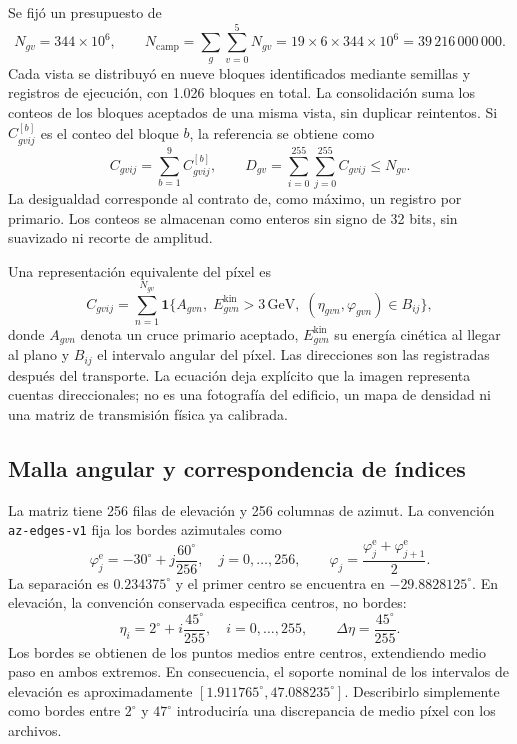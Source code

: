 \documentclass[11pt,a4paper]{article}
\newcommand{\ind}{\mathbf{1}}
\begin{document}
Se fijó un presupuesto de
\begin{equation}
 N_{gv}=344\times10^6,\qquad
 N_{\mathrm{camp}}=\sum_g\sum_{v=0}^{5}N_{gv}
 =19\times6\times344\times10^6
 =39\,216\,000\,000.
 \label{eq:presupuesto}
\end{equation}
Cada vista se distribuyó en nueve bloques identificados mediante semillas y registros de ejecución, con 1.026 bloques en total. La consolidación suma los conteos de los bloques aceptados de una misma vista, sin duplicar reintentos. Si $C^{[b]}_{gvij}$ es el conteo del bloque $b$, la referencia se obtiene como
\begin{equation}
 C_{gvij}=\sum_{b=1}^{9}C^{[b]}_{gvij},\qquad
 D_{gv}=\sum_{i=0}^{255}\sum_{j=0}^{255}C_{gvij}\leq N_{gv}.
 \label{eq:conteos}
\end{equation}
La desigualdad corresponde al contrato de, como máximo, un registro por primario. Los conteos se almacenan como enteros sin signo de 32 bits, sin suavizado ni recorte de amplitud.

Una representación equivalente del píxel es
\begin{equation}
 C_{gvij}=\sum_{n=1}^{N_{gv}}\ind\{A_{gvn},\;E^{\mathrm{kin}}_{gvn}>3\,\mathrm{GeV},
 \;(\eta_{gvn},\varphi_{gvn})\in B_{ij}\},
 \label{eq:indicador}
\end{equation}
donde $A_{gvn}$ denota un cruce primario aceptado, $E^{\mathrm{kin}}_{gvn}$ su energía cinética al llegar al plano y $B_{ij}$ el intervalo angular del píxel. Las direcciones son las registradas después del transporte. La ecuación deja explícito que la imagen representa cuentas direccionales; no es una fotografía del edificio, un mapa de densidad ni una matriz de transmisión física ya calibrada.

\subsection{Malla angular y correspondencia de índices}

La matriz tiene 256 filas de elevación y 256 columnas de azimut. La convención \texttt{az-edges-v1} fija los bordes azimutales como
\begin{equation}
 \varphi^{\mathrm e}_j=-30^\circ+j\frac{60^\circ}{256},\quad j=0,\ldots,256,
 \qquad \varphi_j=\frac{\varphi^{\mathrm e}_j+\varphi^{\mathrm e}_{j+1}}{2}.
\end{equation}
La separación es $0.234375^\circ$ y el primer centro se encuentra en $-29.8828125^\circ$. En elevación, la convención conservada especifica centros, no bordes:
\begin{equation}
 \eta_i=2^\circ+i\frac{45^\circ}{255},\quad i=0,\ldots,255,
 \qquad \Delta\eta=\frac{45^\circ}{255}.
\end{equation}
Los bordes se obtienen de los puntos medios entre centros, extendiendo medio paso en ambos extremos. En consecuencia, el soporte nominal de los intervalos de elevación es aproximadamente $[1.911765^\circ,47.088235^\circ]$. Describirlo simplemente como bordes entre $2^\circ$ y $47^\circ$ introduciría una discrepancia de medio píxel con los archivos.
\end{document}
